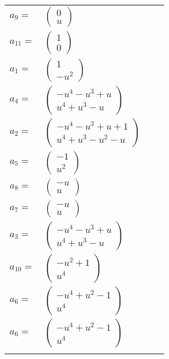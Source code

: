 \documentclass[1p]{elsarticle_modified}
\theoremstyle{definition}
\begin{document}
\begin{tabular}{m{7pt} m{180pt} m{7pt} m{180pt} }
\flushright $a_{9}=$&$\begin{pmatrix}0\\u\end{pmatrix}$ \\
\flushright $a_{11}=$&$\begin{pmatrix}1\\0\end{pmatrix}$ \\
\flushright $a_{1}=$&$\begin{pmatrix}1\\- u^2\end{pmatrix}$ \\
\flushright $a_{4}=$&$\begin{pmatrix}- u^4- u^3+u\\u^4+u^3- u\end{pmatrix}$ \\
\flushright $a_{2}=$&$\begin{pmatrix}- u^4- u^3+u+1\\u^4+u^3- u^2- u\end{pmatrix}$ \\
\flushright $a_{5}=$&$\begin{pmatrix}-1\\u^2\end{pmatrix}$ \\
\flushright $a_{8}=$&$\begin{pmatrix}- u\\u\end{pmatrix}$ \\
\flushright $a_{7}=$&$\begin{pmatrix}- u\\u\end{pmatrix}$ \\
\flushright $a_{3}=$&$\begin{pmatrix}- u^4- u^3+u\\u^4+u^3- u\end{pmatrix}$ \\
\flushright $a_{10}=$&$\begin{pmatrix}- u^2+1\\u^4\end{pmatrix}$ \\
\flushright $a_{6}=$&$\begin{pmatrix}- u^4+u^2-1\\u^4\end{pmatrix}$\\ \flushright $a_{6}=$&$\begin{pmatrix}- u^4+u^2-1\\u^4\end{pmatrix}$\\&\end{tabular}
\end{document}
